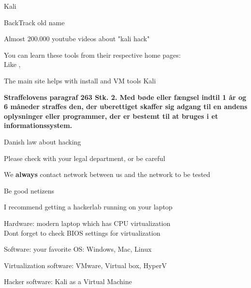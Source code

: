 \documentclass[20pt,landscape,a4paper,footrule]{foils}
\begin{document}
\begin{list1}
\item Kali 
\item BackTrack  old name
\end{list1}



\begin{list1}
\item Almost 200.000 youtube videos about "kali hack"
\item You can learn these tools from their respective home pages:\\
Like , 
\item The main site helps with install and VM tools Kali 
\end{list1}


{\bfseries Straffelovens paragraf 263 Stk. 2. Med bøde eller fængsel indtil 1 år og 6 måneder straffes den, der uberettiget skaffer sig adgang til en andens oplysninger eller programmer, der er bestemt til at bruges i et informationssystem. }

\begin{list2}
\item Danish law about hacking
\item Please check with your legal department, or be careful
\item We {\bf always} contact network between us and the network to be tested
\item Be good netizens
\end{list2}



\begin{list2}
\item I recommend getting a hackerlab running on your laptop
\item Hardware: modern laptop which has CPU virtualization\\
Dont forget to check BIOS settings for virtualization
\item Software: your favorite OS: Windows, Mac, Linux
\item Virtualization software: VMware, Virtual box, HyperV
\item Hacker software: Kali as a Virtual Machine 
\end{list2}
\end{document}
